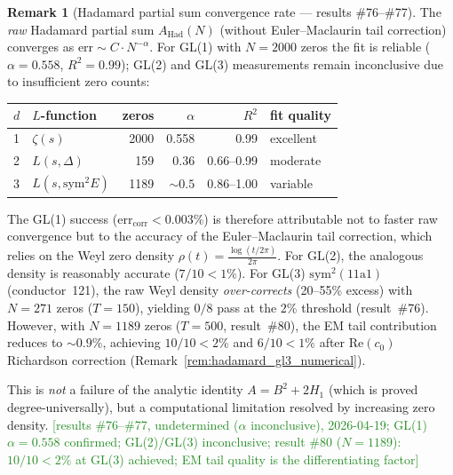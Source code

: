 \documentclass[11pt, a4paper]{article}
\theoremstyle{definition}
\newtheorem{remark}{Remark}[section]
\theoremstyle{plain}
\begin{document}
\begin{remark}[Hadamard partial sum convergence rate --- results \#76--\#77]
\label{rem:hadamard_convergence_rate}
The \emph{raw} Hadamard partial sum $A_{\mathrm{Had}}(N)$ (without Euler--Maclaurin
tail correction) converges as $\mathrm{err} \sim C \cdot N^{-\alpha}$.
For GL(1) with $N{=}2000$ zeros the fit is reliable ($\alpha = 0.558$, $R^2 = 0.99$);
GL(2) and GL(3) measurements remain inconclusive due to insufficient zero counts:
\smallskip
\begin{center}
\small
\begin{tabular}{@{}llrrrl@{}}
\toprule
$d$ & $L$-function & zeros & $\alpha$ & $R^2$ & fit quality \\
\midrule
1 & $\zeta(s)$ & 2000 & 0.558 & 0.99 & excellent \\
2 & $L(s,\Delta)$ & 159 & 0.36 & 0.66--0.99 & moderate \\
3 & $L(s,\mathrm{sym}^2 E)$ & 1189 & $\sim 0.5$ & 0.86--1.00 & variable \\
\bottomrule
\end{tabular}
\end{center}
\smallskip\noindent
The GL(1) success ($\mathrm{err}_{\mathrm{corr}} < 0.003\%$) is therefore
attributable not to faster raw convergence but to the accuracy of the
Euler--Maclaurin tail correction, which relies on the Weyl zero density
$\rho(t) = \tfrac{\log(t/2\pi)}{2\pi}$.  For GL(2), the analogous density is
reasonably accurate ($7/10 < 1\%$).  For GL(3) $\mathrm{sym}^2(11\mathrm{a}1)$
(conductor~121), the raw Weyl density \emph{over-corrects} (20--55\% excess)
with $N=271$ zeros ($T=150$), yielding $0/8$ pass at the $2\%$ threshold
(result~\#76).  However, with $N=1189$ zeros ($T=500$, result~\#80),
the EM tail contribution reduces to ${\sim}0.9\%$, achieving $10/10{<}2\%$
and $6/10{<}1\%$ after Re$(c_0)$ Richardson correction
(Remark~\ref{rem:hadamard_gl3_numerical}).

This is \emph{not} a failure of the analytic identity $A = B^2 + 2H_1$
(which is proved degree-universally), but a computational limitation
resolved by increasing zero density.
\textcolor{ForestGreen}{[results \#76--\#77, undetermined ($\alpha$ inconclusive), 2026-04-19;
GL(1) $\alpha{=}0.558$ confirmed; GL(2)/GL(3) inconclusive;
result \#80 ($N{=}1189$): $10/10{<}2\%$ at GL(3) achieved;
EM tail quality is the differentiating factor]}
\end{remark}
\end{document}
